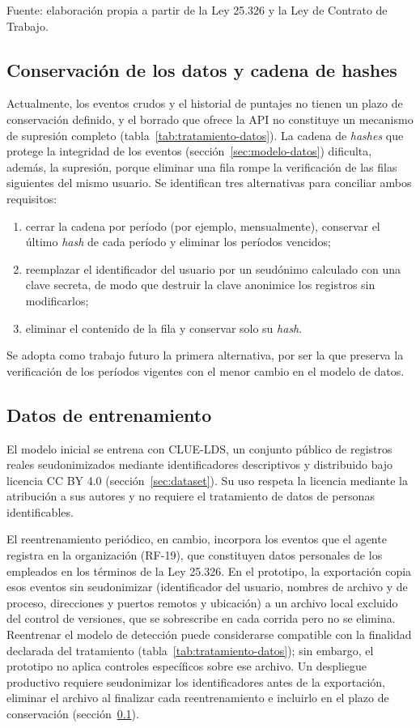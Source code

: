 {\small Fuente: elaboración propia a partir de la Ley 25.326 y la Ley de Contrato de Trabajo.\par}

\subsection{Conservación de los datos y cadena de hashes}
\label{sec:conservacion-datos}
Actualmente, los eventos crudos y el historial de puntajes no tienen un plazo de conservación definido, y el borrado que ofrece la API no constituye un mecanismo de supresión completo (tabla~\ref{tab:tratamiento-datos}). La cadena de \emph{hashes} que protege la integridad de los eventos (sección~\ref{sec:modelo-datos}) dificulta, además, la supresión, porque eliminar una fila rompe la verificación de las filas siguientes del mismo usuario. Se identifican tres alternativas para conciliar ambos requisitos:
\begin{enumerate}
	\item cerrar la cadena por período (por ejemplo, mensualmente), conservar el último \emph{hash} de cada período y eliminar los períodos vencidos;
	\item reemplazar el identificador del usuario por un seudónimo calculado con una clave secreta, de modo que destruir la clave anonimice los registros sin modificarlos;
	\item eliminar el contenido de la fila y conservar solo su \emph{hash}.
\end{enumerate}
Se adopta como trabajo futuro la primera alternativa, por ser la que preserva la verificación de los períodos vigentes con el menor cambio en el modelo de datos.

\subsection{Datos de entrenamiento}
\label{sec:datos-entrenamiento}
El modelo inicial se entrena con CLUE-LDS, un conjunto público de registros reales seudonimizados mediante identificadores descriptivos y distribuido bajo licencia CC BY 4.0 (sección~\ref{sec:dataset}). Su uso respeta la licencia mediante la atribución a sus autores y no requiere el tratamiento de datos de personas identificables.

El reentrenamiento periódico, en cambio, incorpora los eventos que el agente registra en la organización (RF-19), que constituyen datos personales de los empleados en los términos de la Ley 25.326. En el prototipo, la exportación copia esos eventos sin seudonimizar (identificador del usuario, nombres de archivo y de proceso, direcciones y puertos remotos y ubicación) a un archivo local excluido del control de versiones, que se sobrescribe en cada corrida pero no se elimina. Reentrenar el modelo de detección puede considerarse compatible con la finalidad declarada del tratamiento (tabla~\ref{tab:tratamiento-datos}); sin embargo, el prototipo no aplica controles específicos sobre ese archivo. Un despliegue productivo requiere seudonimizar los identificadores antes de la exportación, eliminar el archivo al finalizar cada reentrenamiento e incluirlo en el plazo de conservación (sección~\ref{sec:conservacion-datos}).

